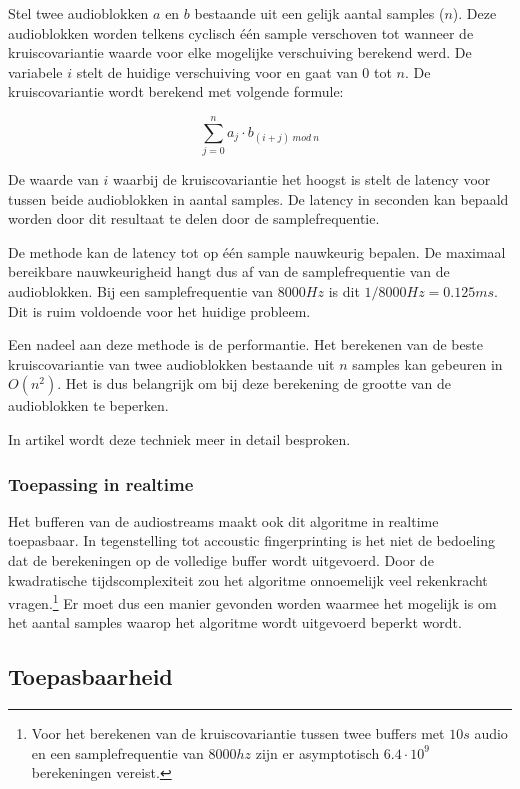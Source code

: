 Stel twee audioblokken $ a $ en $ b $ bestaande uit een gelijk aantal samples ($n$). Deze audioblokken worden telkens cyclisch één sample verschoven tot wanneer de kruiscovariantie waarde voor elke mogelijke verschuiving berekend werd. De variabele $ i $ stelt de huidige verschuiving voor en gaat van 0 tot $ n $. De kruiscovariantie wordt berekend met volgende formule:

\begin{equation}
\sum_{j=0}^{n} a_{j} \cdot b_{(i+j)\ mod\ n}
\end{equation}

De waarde van $ i $ waarbij de kruiscovariantie het hoogst is stelt de latency voor tussen beide audioblokken in aantal samples. De latency in seconden kan bepaald worden door dit resultaat te delen door de samplefrequentie.

De methode kan de latency tot op één sample nauwkeurig bepalen. De maximaal bereikbare nauwkeurigheid hangt dus af van de samplefrequentie van de audioblokken. Bij een samplefrequentie van $8000 Hz$ is dit $ 1/8000 Hz = 0.125 ms $. Dit is ruim voldoende voor het huidige probleem.

Een nadeel aan deze methode is de performantie. Het berekenen van de beste kruiscovariantie van twee audioblokken bestaande uit $ n $ samples kan gebeuren in  $O(n^{2})$. Het is dus belangrijk om bij deze berekening de grootte van de audioblokken te beperken.

In artikel \cite{six2015multimodal} wordt deze techniek meer in detail besproken.

\subsubsection{Toepassing in realtime}

Het bufferen van de audiostreams maakt ook dit algoritme in realtime toepasbaar. In tegenstelling tot accoustic fingerprinting is het niet de bedoeling dat de berekeningen op de volledige buffer wordt uitgevoerd. Door de kwadratische tijdscomplexiteit zou het algoritme onnoemelijk veel rekenkracht vragen.\footnote{Voor het berekenen van de kruiscovariantie tussen twee buffers met $10s$ audio en een samplefrequentie van $8000hz$ zijn er asymptotisch $ 6.4 \cdot 10^9 $ berekeningen vereist.} Er moet dus een manier gevonden worden waarmee het mogelijk is om het aantal samples waarop het algoritme wordt uitgevoerd beperkt wordt.

\subsection{Toepasbaarheid}
\label{toepasbaarheid}

